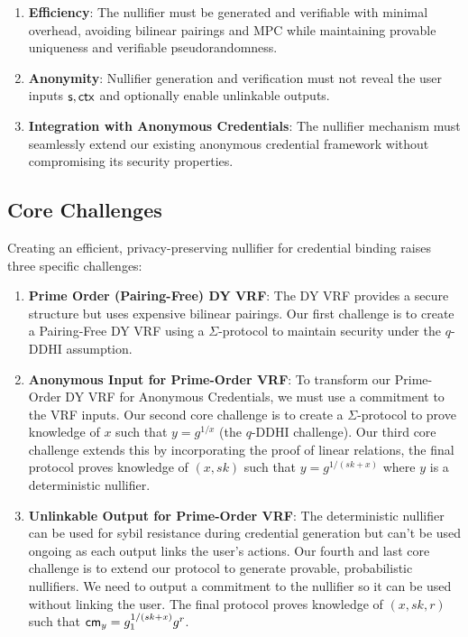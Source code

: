 \begin{enumerate}
    \item \textbf{Efficiency}: The nullifier must be generated and verifiable with minimal overhead, avoiding bilinear pairings and MPC while maintaining provable uniqueness and verifiable pseudorandomness.
    
    \item \textbf{Anonymity}: Nullifier generation and verification must not reveal the user inputs $\mathsf{s}, \mathsf{ctx}$ and optionally enable unlinkable outputs. 
    
    \item \textbf{Integration with Anonymous Credentials}: The nullifier mechanism must seamlessly extend our existing anonymous credential framework without compromising its security properties.
\end{enumerate}

\subsection{Core Challenges}


Creating an efficient, privacy-preserving nullifier for credential binding raises three specific challenges:

\begin{enumerate}
    \item \textbf{Prime Order (Pairing-Free) DY VRF}: The DY VRF provides a secure structure but uses expensive bilinear pairings. Our first challenge is to create a Pairing-Free DY VRF using a $\Sigma$-protocol to maintain security under the $q$-DDHI assumption.
    
    \item \textbf{Anonymous Input for Prime-Order VRF}: To transform our Prime-Order DY VRF for Anonymous Credentials, we must use a commitment to the VRF inputs. Our second core challenge is to create a $\Sigma$-protocol to prove knowledge of $x$ such that $y = g^{1/x}$ (the $q$-DDHI challenge). Our third core challenge extends this by incorporating the proof of linear relations, the final protocol proves knowledge of $(x, sk)$ such that $y = g^{1/(sk + x)}$ where $y$ is a deterministic nullifier.
    
    \item \textbf{Unlinkable Output for Prime-Order VRF}: The deterministic nullifier can be used for sybil resistance during credential generation but can't be used ongoing as each output links the user's actions. Our fourth and last core challenge is to extend our protocol to generate provable, probabilistic nullifiers. We need to output a commitment to the nullifier so it can be used without linking the user. The final protocol proves knowledge of $(x, sk,r)$ such that $\mathsf{cm}_y = g_1^{1/(sk + x)}g^r$. 
\end{enumerate}



